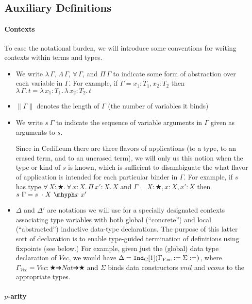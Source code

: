 \documentclass{article}
\newcommand{\ann}[2]{#1\! : \! #2}
\newcommand{\abs}[4]{{#1}\, #2\! : \! #3.\, #4}
\newcommand{\absu}[3]{{#1}\, #2.\, #3}
\newcommand{\indast}[4]{\texttt{Ind}_{\text{#1}} [#2] (#3 := #4)}
\newcommand{\lenc}[1]{\|#1\|}
\begin{document}
\subsection{Auxiliary Definitions}

\paragraph{Contexts}
To ease the notational burden, we will introduce some conventions for writing
contexts within terms and types.

\begin{itemize}
\item We write $\lambda\,\Gamma$, $\Lambda\,\Gamma$, $\forall\,\Gamma$, and
  $\Pi\,\Gamma$ to indicate some form of abstraction over each variable in
  $\Gamma$. For example, if $\Gamma = \ann{x_1}{T_1},\ann{x_2}{T_2}$ then
  $\absu{\lambda}{\Gamma}{t} =
  \abs{\lambda}{x_1}{T_1}{\abs{\lambda}{x_2}{T_2}{t}}$
\item $\lenc{\Gamma}$ denotes the length of $\Gamma$ (the number of variables it
  binds)
\item We write $s\ \Gamma$ to indicate the sequence of variable arguments in
  $\Gamma$ given as arguments to $s$.

  Since in Cedilleum there are three flavors of applications (to a type, to an
  erased term, and to an unerased term), we will only us this notion when the type
  or kind of $s$ is known, which is sufficient to disambiguate the what flavor of
  application is intended for each particular binder in $\Gamma$. For example,
  if $s$ has type
  $\abs{\forall}{X}{★}{\abs{\forall}{x}{X}{\abs{\Pi}{x'}{X}{X}}}$ and $\Gamma =
  \ann{X}{★},\ann{x}{X},\ann{x'}{X}$ then $s\ \Gamma = s\ \cdot X\ \mhyph x\ x'$
\item $\Delta$ and $\Delta'$ are notations we will use
  for a specially designated contexts associating type variables with both global
  (``concrete'') and local (``abstracted'') inductive data-type declarations.
  The purpose of this latter sort of declaration is to enable type-guided
  termination of definitions using fixpoints (see below.) For example, given
  just the (global) data type declaration of $Vec$, we would have $\Delta =
  \indast{C}{1}{\Gamma_{Vec} := \Sigma}$, where $\Gamma_{Vec} = \ann{Vec}{★ ➔ Nat ➔
    ★}$ and  $\Sigma$ binds data constructors $vnil$ and $vcons$ to the
  appropriate types.
\end{itemize}

\paragraph{$p$-arity}
\end{document}
